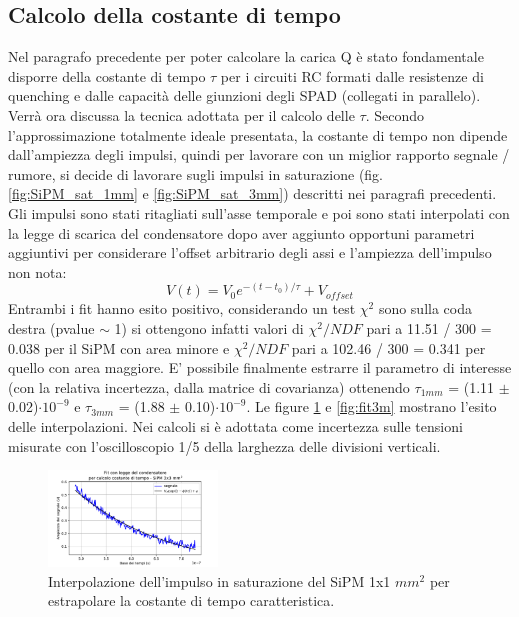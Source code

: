 \documentclass[journal]{IEEEtran}
\begin{document}
\subsection{Calcolo della costante di tempo}
Nel paragrafo precedente per poter calcolare la carica Q è stato fondamentale disporre della costante di tempo $\tau$ per i circuiti RC formati dalle resistenze di quenching e dalle capacità delle giunzioni degli SPAD (collegati in parallelo). Verrà ora discussa la tecnica adottata per il calcolo delle $\tau$. Secondo l'approssimazione totalmente ideale presentata, la costante di tempo non dipende dall'ampiezza degli impulsi, quindi per lavorare con un miglior rapporto segnale / rumore, si decide di lavorare sugli impulsi in saturazione (fig. \ref{fig:SiPM_sat_1mm} e \ref{fig:SiPM_sat_3mm}) descritti nei paragrafi precedenti. Gli impulsi sono stati ritagliati sull'asse temporale e poi sono stati interpolati con la legge di scarica del condensatore dopo aver aggiunto opportuni parametri aggiuntivi per considerare l'offset arbitrario degli assi e l'ampiezza dell'impulso non nota:
\begin{equation}
    V(t) = V_0 e^{-(t-t_0)/\tau} + V_{offset}
\end{equation}
Entrambi i fit hanno esito positivo, considerando un test $\chi^2$ sono sulla coda destra (pvalue $\sim$ 1) si ottengono infatti valori di $\chi^2 / NDF$ pari a 11.51  /  300 = 0.038 per il SiPM con area minore e $\chi^2 / NDF$ pari a 102.46 /  300 = 0.341 per quello con area maggiore. E' possibile finalmente estrarre il parametro di interesse (con la relativa incertezza, dalla matrice di covarianza) ottenendo $\tau_{1mm}$ = (1.11 $\pm$ 0.02)$\cdot 10^{-9}$ e $\tau_{3mm}$ = (1.88 $\pm$ 0.10)$\cdot 10^{-9}$. Le figure \ref{fig:fit1m} e \ref{fig:fit3m} mostrano l'esito delle interpolazioni. Nei calcoli si è adottata come incertezza sulle tensioni misurate con l'oscilloscopio 1/5 della larghezza delle divisioni verticali.

\begin{figure}[H]%
\begin{center}
\includegraphics[width=0.40\textwidth]{analysis/output/SiPM_fit_3mm.pdf}
\caption{Interpolazione dell'impulso in saturazione del SiPM 1x1 $mm^2$ per estrapolare la costante di tempo caratteristica.}
\label{fig:fit1m}
\end{center}
\end{figure}
\end{document}
